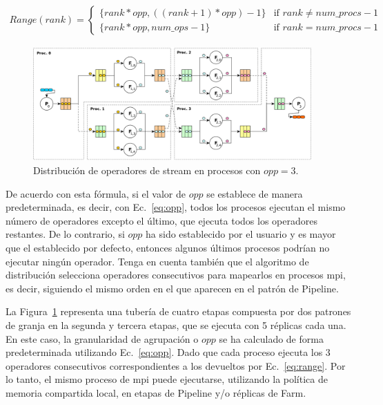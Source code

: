 \vspace{0.35cm}
\begin{gather}\label{eq:range}
  Range(rank) =
  \begin{cases}
  \{rank * opp, ((rank+1)*opp)-1\} & \text{if $rank\neq num\_procs-1$} \\
  \{rank * opp, num\_ops-1\} & \text{if $rank=num\_procs-1$} 
  \end{cases}
\end{gather}

\vspace{0.35cm}
\begin{figure}[ht!]
  \centering
  \includegraphics[width=0.95\textwidth]{figures/pipeline-mapping.pdf}\vspace{-0.2cm}
  \caption{Distribución de operadores de stream en procesos con $opp=3$.}\label{fig:mapping}
\end{figure}
\vspace{0.35cm}

De acuerdo con esta fórmula, si el valor de $opp$ se establece de manera predeterminada, es decir, con Ec.~\ref{eq:opp}, todos los procesos ejecutan el mismo número de operadores excepto el último, que ejecuta todos los operadores restantes. De lo contrario, si $opp$ ha sido establecido por el usuario y es mayor que el establecido por defecto, entonces algunos últimos procesos podrían no ejecutar ningún operador. Tenga en cuenta también que el algoritmo de distribución selecciona operadores consecutivos para mapearlos en procesos \acrshort{mpi}, es decir, siguiendo el mismo orden en el que aparecen en el patrón de Pipeline.

La Figura~\ref{fig:mapping} representa una tubería de cuatro etapas compuesta por dos patrones de granja en la segunda y tercera etapas, que se ejecuta con 5 réplicas cada una. En este caso, la granularidad de agrupación o $opp$ se ha calculado de forma predeterminada utilizando Ec.~\ref{eq:opp}. Dado que cada proceso ejecuta los 3 operadores consecutivos correspondientes a los devueltos por Ec.~\ref{eq:range}. Por lo tanto, el mismo proceso de \acrshort{mpi} puede ejecutarse, utilizando la política de memoria compartida local, en etapas de Pipeline y/o réplicas de Farm. 

